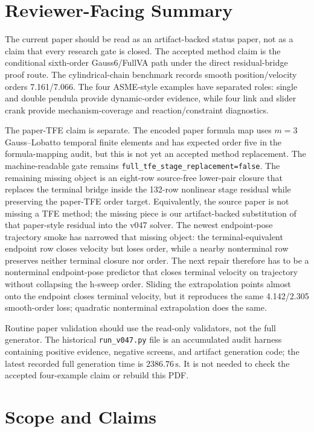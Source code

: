 \documentclass[11pt]{article}
\newcommand{\method}{Gauss6/FullVA}
\newcommand{\tfe}{TFE}
\newcommand{\artifact}[1]{\texttt{#1}}
\begin{document}
\section*{Reviewer-Facing Summary}

The current paper should be read as an artifact-backed status paper, not as a
claim that every research gate is closed.  The accepted method claim is the
conditional sixth-order \method{} path under the direct residual-bridge proof
route.  The cylindrical-chain benchmark records smooth position/velocity
orders 7.161/7.066.  The four ASME-style examples have separated roles:
single and double pendula provide dynamic-order evidence, while four link and
slider crank provide mechanism-coverage and reaction/constraint diagnostics.

The paper-\tfe{} claim is separate.  The encoded paper formula map uses
$m=3$ Gauss--Lobatto temporal finite elements and has expected order five in
the formula-mapping audit, but this is not yet an accepted method replacement.
The machine-readable gate remains
\nolinkurl{full_tfe_stage_replacement=false}.  The remaining missing object is
an eight-row source-free lower-pair closure that replaces the terminal bridge
inside the 132-row nonlinear stage residual while preserving the paper-\tfe{}
order target.
Equivalently, the source paper is not missing a \tfe{} method; the missing
piece is our artifact-backed substitution of that paper-style residual into
the v047 solver.
The newest endpoint-pose trajectory smoke has narrowed that missing object:
the terminal-equivalent endpoint row closes velocity but loses order, while a
nearby nonterminal row preserves neither terminal closure nor order.  The next
repair therefore has to be a nonterminal endpoint-pose predictor that closes
terminal velocity on trajectory without collapsing the h-sweep order.  Sliding
the extrapolation points almost onto the endpoint closes terminal velocity, but
it reproduces the same 4.142/2.305 smooth-order loss; quadratic nonterminal
extrapolation does the same.

Routine paper validation should use the read-only validators, not the full
generator.  The historical \artifact{run\_v047.py} file is an accumulated
audit harness containing positive evidence, negative screens, and artifact
generation code; the latest recorded full generation time is
$2386.76\,\mathrm{s}$.  It is not needed to check the accepted four-example
claim or rebuild this PDF.

\section{Scope and Claims}
\end{document}
